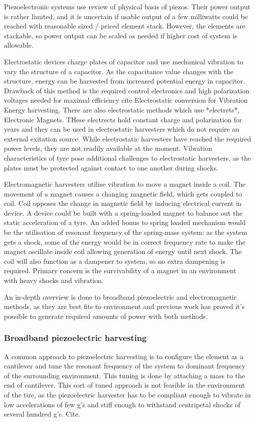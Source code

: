 Piezoelectronic systems use {\color{red} review of physical basis of piezos}. Their power output is rather limited, and it is uncertain if usable output of a few milliwatts could be reached with reasonable sized / priced element stack. However, the elements are stackable, so power output can be scaled as needed if higher cost of system is allowable.

Electrostatic devices charge plates of capacitor and use mechanical vibration to vary the structure of a capacitor. As the capacitance value changes with the structure, energy can be harvested from increased potential energy in capacitor. Drawback of this method is the required control electronics and high polarization voltages needed for maximal efficiency {\color{red} cite Electrostatic conversion for Vibration Energy harvesting}. There are also electrostatic methods which use *electrets*, Electronic Magnets. THese electrects hold constant charge and polarization for years and they can be used in electrostatic harvesters which do not require an external exitation source. While electrostatic harvesters have reached the required power levels, they are not readily available at the moment. Vibration characteristics of tyre pose additional challenges to electrostatic harvesters, as the plates must be protected against contact to one another during shocks. 

Electromagnetic harvesters utilise vibration to move a magnet inside a coil. The movement of a magnet causes a changing magnetic field, which gets coupled to coil. Coil opposes the change in magnetic field by inducing electrical current in device. A device could be built with a spring-loaded magnet to balance out the static acceleration of a tyre. An added bonus to spring loaded mechanism would be the utilisation of resonant frequency of the spring-mass system: as the system gets a shock, some of the energy would be in correct frequency rate to make the magnet oscillate inside coil allowing generation of energy until next shock. The coil will also function  as a dampener to system, so no extra dampening is required. Primary concern is the survivability of a magnet in an environment with heavy shocks and vibration. 

An in-depth overview is done to broadband piezoelectric and electromagnetic methods, as they are best fits to environment and previous work has proved it's possible to generate required amounts of power with both methods.

\subsubsection{Broadband piezoelectric harvesting}
A common approach to piezoelectric harvesting is to configure the element as a cantilever and tune the resonant frequency of the system to dominant frequency of the surrounding environment. This tuning is done by attaching a mass to the end of cantilever. This sort of tuned approach is not feasible in the environment of the tire, as the piezoelectric harvester has to be compliant enough to vibrate in low accelerations of few g's and stiff enough to withstand centripetal shocks of several hundred g's. {\color{red} Cite}. 


